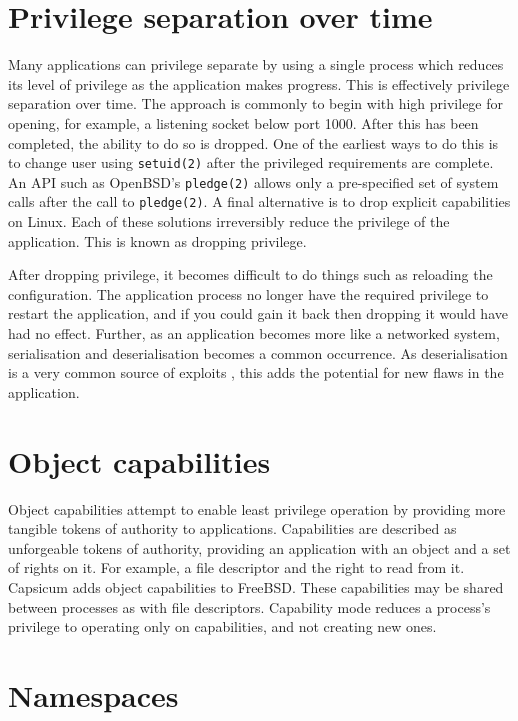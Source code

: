 \documentclass[a4paper,12pt,twoside,openright]{report}
\begin{document}
\section{Privilege separation over time}

Many applications can privilege separate by using a single process which reduces its level of privilege as the application makes progress. This is effectively privilege separation over time. The approach is commonly to begin with high privilege for opening, for example, a listening socket below port 1000. After this has been completed, the ability to do so is dropped. One of the earliest ways to do this is to change user using \texttt{setuid(2)} after the privileged requirements are complete. An API such as OpenBSD's \texttt{pledge(2)} allows only a pre-specified set of system calls after the call to \texttt{pledge(2)}. A final alternative is to drop explicit capabilities on Linux. Each of these solutions irreversibly reduce the privilege of the application. This is known as dropping privilege.

After dropping privilege, it becomes difficult to do things such as reloading the configuration. The application process no longer have the required privilege to restart the application, and if you could gain it back then dropping it would have had no effect. Further, as an application becomes more like a networked system, serialisation and deserialisation becomes a common occurrence. As deserialisation is a very common source of exploits \citep{the_mitre_corporation_deserialization_2006}, this adds the potential for new flaws in the application.

\section{Object capabilities}

Object capabilities attempt to enable least privilege operation by providing more tangible tokens of authority to applications. Capabilities are described as unforgeable tokens of authority, providing an application with an object and a set of rights on it. For example, a file descriptor and the right to read from it. Capsicum \citep{watson_capsicum_2010} adds object capabilities to FreeBSD. These capabilities may be shared between processes as with file descriptors. Capability mode reduces a process's privilege to operating only on capabilities, and not creating new ones.

\section{Namespaces}
\end{document}
